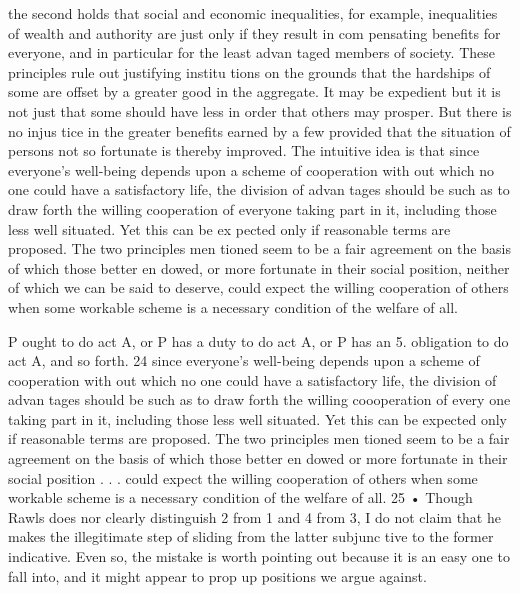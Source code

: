 \documentclass[11pt,openany]{book}
\begin{document}
{the second holds that social and economic inequalities, for example, inequalities of wealth and authority are just only if they result in com pensating benefits for everyone, and in particular for the least advan taged members of society. These principles rule out justifying institu tions on the grounds that the hardships of some are offset by a greater good in the aggregate. It may be expedient but it is not just that some should have less in order that others may prosper. But there is no injus tice in the greater benefits earned by a few provided that the situation of persons not so fortunate is thereby improved. The intuitive idea is that since everyone's well-being depends upon a scheme of cooperation with out which no one could have a satisfactory life, the division of advan tages should be such as to draw forth the willing cooperation of everyone taking part in it, including those less well situated. Yet this can be ex pected only if reasonable terms are proposed. The two principles men tioned seem to be a fair agreement on the basis of which those better en dowed, or more fortunate in their social position, neither of which we can be said to deserve, could expect the willing cooperation of others when some workable scheme is a necessary condition of the welfare of all.\par

P ought to do act A, or P has a duty to do act A, or P has an 5. obligation to do act A, and so forth. 24 since everyone's well-being depends upon a scheme of cooperation with out which no one could have a satisfactory life, the division of advan tages should be such as to draw forth the willing coooperation of every one taking part in it, including those less well situated. Yet this can be expected only if reasonable terms are proposed. The two principles men tioned seem to be a fair agreement on the basis of which those better en dowed or more fortunate in their social position . . . could expect the willing cooperation of others when some workable scheme is a necessary condition of the welfare of all. 25 • Though Rawls does nor clearly distinguish 2 from 1 and 4 from 3, I do not claim that he makes the illegitimate step of sliding from the latter subjunc tive to the former indicative. Even so, the mistake is worth pointing out because it is an easy one to fall into, and it might appear to prop up positions we argue against.\par

}
\end{document}
